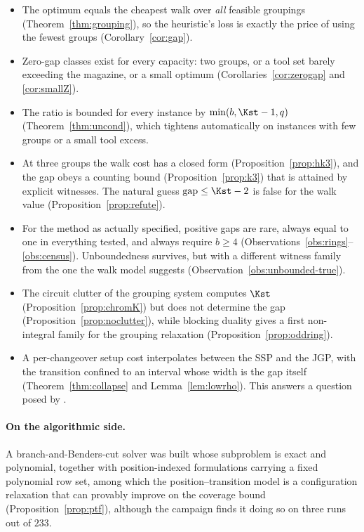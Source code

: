 \begin{itemize}[topsep=3pt,itemsep=2pt]
  \item The optimum equals the cheapest walk over \emph{all} feasible groupings
  (Theorem~\ref{thm:grouping}), so the heuristic's loss is exactly the price of using
  the fewest groups (Corollary~\ref{cor:gap}).
  \item Zero-gap classes exist for every capacity: two groups, or a tool set barely
  exceeding the magazine, or a small optimum (Corollaries~\ref{cor:zerogap} and
  \ref{cor:smallZ}).
  \item The ratio is bounded for every instance by
  $\min(b,\Kst-1,q)$ (Theorem~\ref{thm:uncond}), which tightens automatically on
  instances with few groups or a small tool excess.
  \item At three groups the walk cost has a closed form
  (Proposition~\ref{prop:hk3}), and the gap obeys a counting bound
  (Proposition~\ref{prop:k3}) that is attained by explicit witnesses. The natural
  guess $\mathrm{gap}\le\Kst-2$ is false for the walk value
  (Proposition~\ref{prop:refute}).
  \item For the method as actually specified, positive gaps are rare, always equal to
  one in everything tested, and always require $b\ge4$
  (Observations~\ref{obs:rings}--\ref{obs:census}). Unboundedness survives, but with a
  different witness family from the one the walk model suggests
  (Observation~\ref{obs:unbounded-true}).
  \item The circuit clutter of the grouping system computes $\Kst$
  (Proposition~\ref{prop:chromK}) but does not determine the gap
  (Proposition~\ref{prop:noclutter}), while blocking duality gives a first
  non-integral family for the grouping relaxation
  (Proposition~\ref{prop:oddring}).
  \item A per-changeover setup cost interpolates between the SSP and the JGP, with the
  transition confined to an interval whose width is the gap itself
  (Theorem~\ref{thm:collapse} and Lemma~\ref{lem:lowrho}). This answers a question
  posed by \citet{Burger2015}.
\end{itemize}

\paragraph{On the algorithmic side.}
A branch-and-Benders-cut solver was built whose subproblem is exact and polynomial,
together with position-indexed formulations carrying a fixed polynomial row set, among
which the position--transition model is a configuration relaxation that can provably
improve on the coverage bound (Proposition~\ref{prop:ptf}), although the campaign finds
it doing so on three runs out of $233$.

